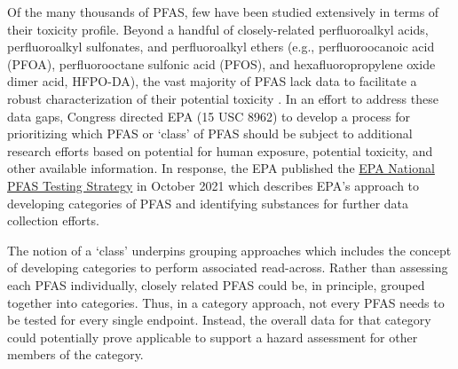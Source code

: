 \documentclass[
  super,
  preprint,
  3p]{elsarticle}
\begin{document}
Of the many thousands of PFAS, few have been studied extensively in
terms of their toxicity profile. Beyond a handful of closely-related
perfluoroalkyl acids, perfluoroalkyl sulfonates, and perfluoroalkyl
ethers (e.g., perfluoroocanoic acid (PFOA), perfluorooctane sulfonic
acid (PFOS), and hexafluoropropylene oxide dimer acid, HFPO-DA), the
vast majority of PFAS lack data to facilitate a robust characterization
of their potential toxicity \citep{carlson_systematic_2022}. In an
effort to address these data gaps, Congress directed EPA (15 USC 8962)
to develop a process for prioritizing which PFAS or `class' of PFAS
should be subject to additional research efforts based on potential for
human exposure, potential toxicity, and other available information. In
response, the EPA published the
\href{https://www.epa.gov/assessing-and-managing-chemicals-under-tsca/national-pfas-testing-strategy}{EPA
National PFAS Testing Strategy} in October 2021 which describes EPA's
approach to developing categories of PFAS and identifying substances for
further data collection efforts.

The notion of a `class' underpins grouping approaches which includes the
concept of developing categories to perform associated read-across.
Rather than assessing each PFAS individually, closely related PFAS could
be, in principle, grouped together into categories. Thus, in a category
approach, not every PFAS needs to be tested for every single endpoint.
Instead, the overall data for that category could potentially prove
applicable to support a hazard assessment for other members of the
category.
\end{document}

